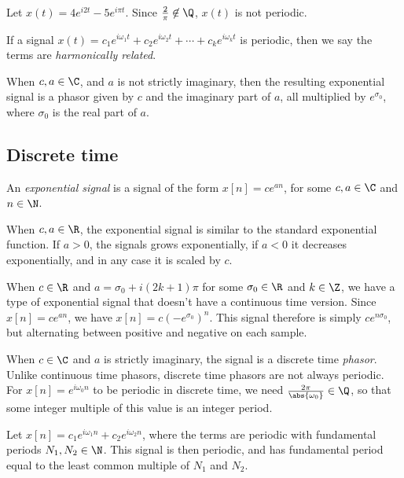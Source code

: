 \documentclass[12pt]{article}
\begin{document}
\begin{exmp}
    Let $x(t) = 4e^{i2t} - 5e^{i\pi t}$. Since $\frac{2}{\pi} \not\in \Q$, $x(t)$ is not periodic.
\end{exmp}

\begin{defn}
    If a signal $x(t) = c_1e^{i\omega_1t} + c_2e^{i\omega_2t} + \cdots + c_ke^{i\omega_kt}$ is periodic, then we say the terms are \emph{harmonically related}.
\end{defn}

When $c, a \in \C$, and $a$ is not strictly imaginary, then the resulting exponential signal is a phasor given by $c$ and the imaginary part of $a$, all multiplied by $e^{\sigma_0}$, where $\sigma_0$ is the real part of $a$.

\subsection{Discrete time}

\begin{defn}
    An \emph{exponential signal} is a signal of the form $x[n] = ce^{an}$, for some $c, a \in \C$ and $n \in \N$.
\end{defn}

When $c, a \in \R$, the exponential signal is similar to the standard exponential function. If $a > 0$, the signals grows exponentially, if $a < 0$ it decreases exponentially, and in any case it is scaled by $c$.

When $c \in \R$ and $a = \sigma_0 + i(2k+1)\pi$ for some $\sigma_0 \in \R$ and $k \in \Z$, we have a type of exponential signal that doesn't have a continuous time version. Since $x[n] = ce^{an}$, we have $x[n] = c\left(-e^{\sigma_0}\right)^n$. This signal therefore is simply $ce^{n\sigma_0}$, but alternating between positive and negative on each sample.

When $c \in \C$ and $a$ is strictly imaginary, the signal is a discrete time \emph{phasor}. Unlike continuous time phasors, discrete time phasors are not always periodic. For $x[n] = e^{i\omega_0n}$ to be periodic in discrete time, we need $\frac{2\pi}{\abs{\omega_0}} \in \Q$, so that some integer multiple of this value is an integer period.

\begin{thm}
    Let $x[n] = c_1e^{i\omega_1n} + c_2e^{i\omega_2n}$, where the terms are periodic with fundamental periods $N_1, N_2 \in \N$. This signal is then periodic, and has fundamental period equal to the least common multiple of $N_1$ and $N_2$.
\end{thm}
\end{document}
